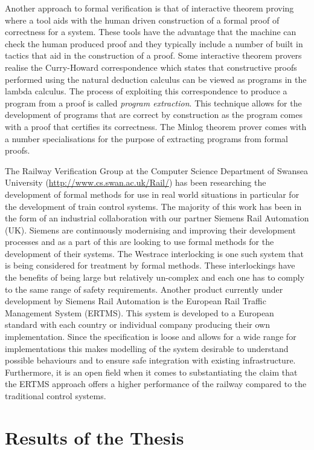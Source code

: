 Another approach to formal verification is that of interactive theorem proving \cite{HG09,SSD06} where a tool aids with the human driven construction of a formal proof of correctness for a system. These tools have the advantage that the machine can check the human produced proof and they typically include a number of built in tactics that aid in the construction of a proof. Some interactive theorem provers realise the Curry-Howard correspondence \cite{HC34, HC58, WH80} which states that constructive proofs performed using the natural deduction calculus can be viewed as programs in the lambda calculus.  The process of exploiting this correspondence to produce a program from a proof is called \emph{program extraction}. This technique allows for the development of programs that are correct by construction as the program comes with a proof that certifies its correctness. The Minlog theorem prover comes with a number specialisations for the purpose of extracting programs from formal proofs.

The Railway Verification Group at the Computer Science Department of Swansea University (\url{http://www.cs.swan.ac.uk/Rail/}) has been researching the development of formal methods for use in real world situations in particular for the development of train control systems. The majority of this work has been in the form of an industrial collaboration with our partner Siemens Rail Automation (UK). Siemens are continuously modernising and improving their development processes and as a part of this are looking to use formal methods for the development of their systems. The Westrace interlocking is one such system that is being considered for treatment by formal methods. These interlockings have the benefits of being large but relatively un-complex and each one has to comply to the same range of safety requirements.  Another product currently under development by Siemens Rail Automation is the European Rail Traffic Management System (ERTMS). This system is developed to a European  standard with each country or individual company producing their own implementation. Since the specification is loose and allows for a wide range for implementations this makes modelling of the system desirable to understand possible behaviours and to ensure safe integration with existing infrastructure. Furthermore, it is an open field  when it comes to substantiating the claim that the ERTMS approach offers a higher performance of the railway compared to the traditional control systems.

\section{Results of the Thesis}

